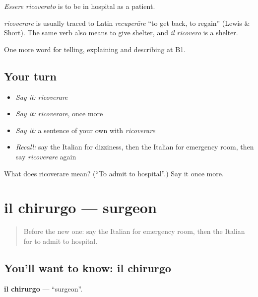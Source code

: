 \emph{Essere ricoverato} is to be in hospital as a patient.

\begin{cousinweb}
\emph{ricoverare} is usually traced to Latin \emph{recuperāre} \textquotedblleft{}to get back, to regain\textquotedblright{} (Lewis \& Short). The same verb also means to give shelter, and \emph{il ricovero} is a shelter.
\end{cousinweb}

\begin{grammarlens}[title={What you've built}]
One more word for telling, explaining and describing at B1.
\end{grammarlens}

\subsection*{Your turn}
\begin{itemize}
\raggedright
  \item \emph{Say it:} \emph{ricoverare}
  \item \emph{Say it:} \emph{ricoverare}, once more
  \item \emph{Say it:} a sentence of your own with \emph{ricoverare}
  \item \emph{Recall:} say the Italian for dizziness, then the Italian for emergency room, then say \emph{ricoverare} again
\end{itemize}

\begin{tcolorbox}[breakable,colback=teal!4,colframe=teal!35!black,title={Before you move on}]
What does ricoverare mean? (\textquotedblleft{}To admit to hospital\textquotedblright{}.) Say it once more.
\end{tcolorbox}
\section[il chirurgo]{il chirurgo — surgeon}

\label{lesson:IT-C488-chirurgo}



\begin{quote}
Before the new one: say the Italian for emergency room, then the Italian for to admit to hospital.
\end{quote}

\subsection*{You'll want to know: il chirurgo}
\textbf{il chirurgo} — \textquotedblleft{}surgeon\textquotedblright{}.

